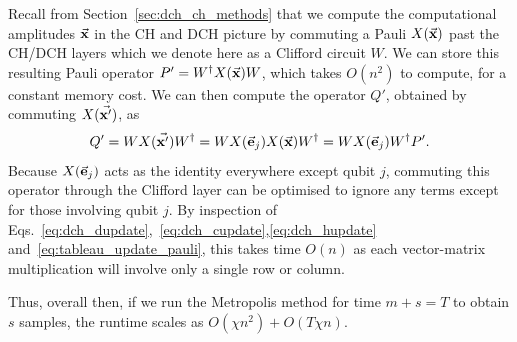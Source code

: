 Recall from Section~\ref{sec:dch_ch_methods} that we compute the computational amplitudes $\va{x}$ in the CH and DCH picture by commuting a Pauli $X(\va{x})$ past the CH/DCH layers which we denote here as a Clifford circuit $W$. We can store this resulting Pauli operator $P'=W^{\dagger}X(\va{x})W$, which takes $O(n^{2})$ to compute, for a constant memory cost. We can then compute the operator $Q'$, obtained by commuting $X(\va{x'})$, as
\[Q' = WX(\va{x'})W^{\dagger} = WX(\va{e}_{j})X(\va{x})W^{\dagger} = WX(\va{e}_{j})W^{\dagger} P'.\]
Because $X(\va{e}_{j})$ acts as the identity everywhere except qubit $j$, commuting this operator through the Clifford layer can be optimised to ignore any terms except for those involving qubit $j$. By inspection of Eqs.~\ref{eq:dch_dupdate},~\ref{eq:dch_cupdate},\ref{eq:dch_hupdate} and~\ref{eq:tableau_update_pauli}, this takes time $O(n)$ as each vector-matrix multiplication will involve only a single row or column.\par
Thus, overall then, if we run the Metropolis method for time $m+s=T$ to obtain $s$ samples, the runtime scales as $O\left(\chi n^{2}\right)+O\left(T\chi n\right)$.
